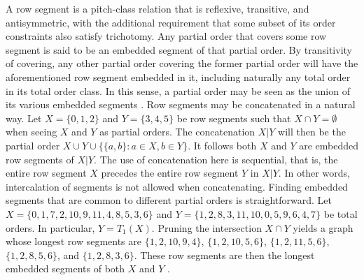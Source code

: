 \newpage
A row segment is a pitch-class relation that is reflexive, transitive, and antisymmetric, with the additional requirement that some subset of its order constraints also satisfy trichotomy. Any partial order that covers some row segment is said to be an embedded segment of that partial order. By transitivity of covering, any other partial order covering the former partial order will have the aforementioned row segment embedded in it, including naturally any total order in its total order class. In this sense, a partial order may be seen as the union of its various embedded segments \cite[198]{Starr1984}. Row segments may be concatenated in a natural way. Let $X = \{ 0, 1, 2 \}$ and $Y = \{ 3, 4, 5 \}$ be row segments such that $X \cap Y = \emptyset$ when seeing $X$ and $Y$ as partial orders. The concatenation $X | Y$ will then be the partial order $X \cup Y \cup \{ \{ a, b \} : a \in X, b \in Y \}$. It follows both $X$ and $Y$ are embedded row segments of $X | Y$. The use of concatenation here is sequential, that is, the entire row segment $X$ precedes the entire row segment $Y$ in $X | Y$. In other words, intercalation of segments is not allowed when concatenating. Finding embedded segments that are common to different partial orders is straightforward. Let $X = \{ 0, 1, 7, 2, 10, 9, 11, 4, 8, 5, 3, 6 \}$ and $Y = \{ 1, 2, 8, 3, 11, 10, 0, 5, 9, 6, 4, 7 \}$ be total orders. In particular, $Y = T_1(X)$. Pruning the intersection $X \cap Y$ yields a graph whose longest row segments are $\{ 1, 2, 10, 9, 4 \}$, $\{ 1, 2, 10, 5, 6 \}$, $\{ 1, 2, 11, 5, 6 \}$, $\{ 1, 2, 8, 5, 6 \}$, and $\{ 1, 2, 8, 3, 6 \}$. These row segments are then the longest embedded segments of both $X$ and $Y$ \cite[200]{Starr1984}.

